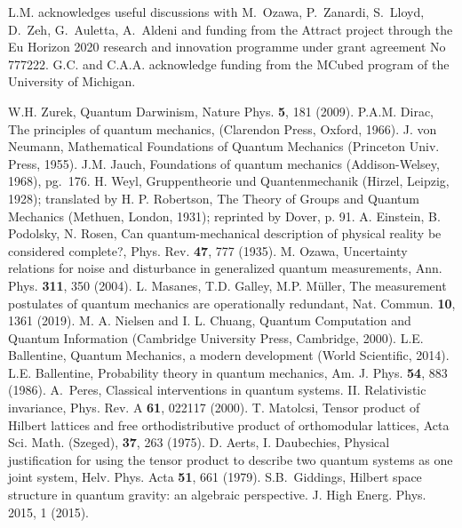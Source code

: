 \documentclass[aps,prl,amsmath,amssymb,twocolumn,nofootinbib]{revtex4}
\theoremstyle{plain}
\theoremstyle{definition}
\theoremstyle{remark}
\begin{document}
L.M. acknowledges useful discussions with M.~Ozawa, P.~Zanardi,
S.~Lloyd, D.~Zeh, G.~Auletta, A.~Aldeni and funding from
the Attract project through the Eu Horizon 2020 research and
innovation programme under grant agreement No 777222. G.C. and C.A.A. acknowledge funding from the MCubed program of the University of Michigan.

\begin{references}
 W.H. Zurek, Quantum Darwinism, Nature Phys. {\bf 5},
  181 (2009).
P.A.M. Dirac, The principles of quantum mechanics,
  (Clarendon Press, Oxford, 1966).
J. von Neumann, Mathematical Foundations of
  Quantum Mechanics (Princeton Univ.  Press, 1955).
J.M. Jauch, Foundations of quantum mechanics
  (Addison-Welsey, 1968), pg.~176.
 H. Weyl, Gruppentheorie und Quantenmechanik (Hirzel,
  Leipzig, 1928); translated by H. P. Robertson, The Theory of Groups
  and Quantum Mechanics (Methuen, London, 1931); reprinted by Dover,
  p. 91.
A. Einstein, B. Podolsky, N. Rosen, Can
  quantum-mechanical description of physical reality be considered
  complete?, Phys. Rev. {\bf 47}, 777 (1935).
M. Ozawa, {Uncertainty relations for noise and
    disturbance in generalized quantum measurements}, Ann. Phys.  {\bf
    311}, 350 (2004).
L. Masanes, T.D. Galley, M.P. M\" uller, The
  measurement postulates of quantum mechanics are operationally
  redundant, Nat. Commun. {\bf 10}, 1361 (2019).
M. A. Nielsen and I. L. Chuang, Quantum Computation
  and Quantum Information (Cambridge University Press, Cambridge,
  2000).
L.E. Ballentine, Quantum Mechanics, a modern
  development (World Scientific, 2014).
L.E. Ballentine, Probability theory in
  quantum mechanics, Am. J. Phys. {\bf 54}, 883 (1986).
A.~Peres, Classical interventions in quantum systems.
  II. Relativistic invariance, Phys. Rev. A {\bf 61}, 022117 (2000).
 T. Matolcsi, Tensor product of Hilbert lattices and
  free orthodistributive product of orthomodular lattices, Acta Sci.
  Math. (Szeged), {\bf 37}, 263 (1975).
 D. Aerts, I. Daubechies, Physical justification for
  using the tensor product to describe two quantum systems as one
  joint system, Helv. Phys. Acta {\bf 51}, 661 (1979).
S.B.~Giddings, Hilbert space structure in quantum
  gravity: an algebraic perspective. J. High Energ. Phys. 2015, 1
  (2015).%

\end{references}
\end{document}
